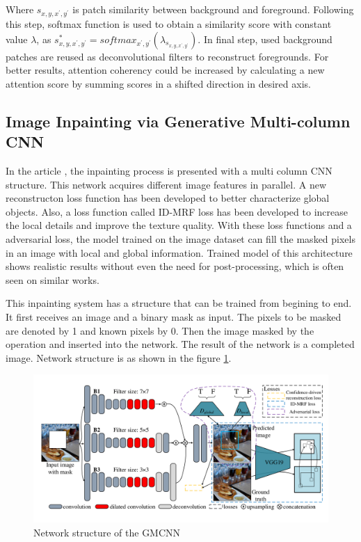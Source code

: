 Where \(s_{x,y,x^{'},y^{'}}\) is patch similarity between background and foreground. Following this step, softmax function is used to obtain a similarity score with constant value \(\lambda\), as \(s^{*}_{x,y,x^{'},y^{'}} = softmax_{x^{'},y^{'} } ( \lambda_{s_{x,y,x^{'},y^{'} } } )\). In final step, used background patches are reused as deconvolutional filters to reconstruct foregrounds. For better results, attention coherency could be increased by calculating a new attention score by summing scores in a shifted direction in desired axis.

\subsection{Image Inpainting via Generative Multi-column CNN}

In the article \cite{inpainting_via_multi_cnn}, the inpainting process is presented with a multi column CNN structure. This network acquires different image features in parallel. A new reconstructon loss function has been developed to better characterize global objects. Also, a loss function called ID-MRF loss has been developed to increase the local details and improve the texture quality. With these loss functions and a adversarial loss, the model trained on the image dataset can fill the masked pixels in an image with local and global information. Trained model of this architecture shows realistic results without even the need for post-processing, which is often seen on similar works.

This inpainting system has a structure that can be trained from begining to end. It first receives an image and a binary mask as input. The pixels to be masked are denoted by 1 and known pixels by 0. Then the image masked by the  operation and inserted into the network. The result of the network is a completed image. Network structure is as shown in the figure \ref{fig:gmcnn}.

\begin{figure}[h]
    \centering
    \includegraphics[width=14cm]{figures/chapter4/gmcnn.png}
    \caption{Network structure of the GMCNN \cite{inpainting_via_multi_cnn}}
    \label{fig:gmcnn}
\end{figure}

